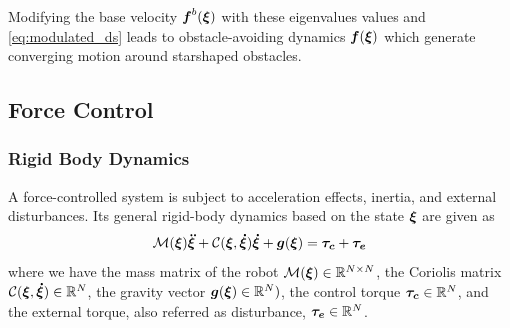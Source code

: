 \iflong
Modifying the base velocity $\boldsymbol{f}^b(\boldsymbol{\xi})$ with these eigenvalues values and \eqref{eq:modulated_ds} leads to obstacle-avoiding dynamics $\boldsymbol{f}(\boldsymbol{\xi})$ which generate converging motion around starshaped obstacles.
\fi

\subsection{Force Control}

\subsubsection{Rigid Body Dynamics}
A force-controlled system is subject to acceleration effects, inertia, and external disturbances. Its general rigid-body dynamics based on the state $\boldsymbol{\xi}$ are given as
\begin{equation}
\matd{M}(\vecs\xi)\vecs{\ddot\xi} + \matd{C}(\vecs\xi, \vecs{\dot\xi})\vecs{\dot\xi} + \vect g(\vecs\xi) = \vecs{\tau_c} + \vecs{\tau_e}
 \label{eq:robot_dynamics}
\end{equation}
where we have the mass matrix of the robot $\mathcal{M}(\boldsymbol{\xi}) \in \mathbb{R}^{N \times N}$, the Coriolis matrix $\mathcal{C}(\boldsymbol{\xi},\boldsymbol{\dot\xi}) \in \mathbb{R}^N$, the gravity vector $\boldsymbol{g}(\boldsymbol{\xi}) \in \mathbb{R}^N)$, the control torque $\boldsymbol{\tau_c} \in \mathbb{R}^N$, and the external torque, also referred as disturbance, $\boldsymbol{\tau_e} \in \mathbb{R}^N$.

